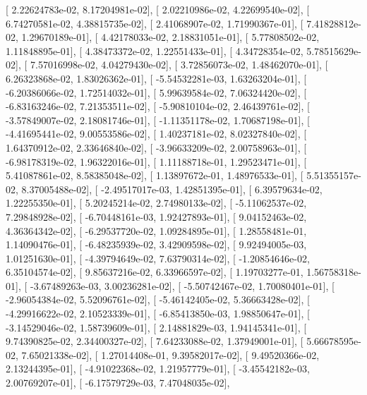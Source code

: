 \documentclass{article}
\begin{document}
       [  2.22624783e-02,   8.17204981e-02],
       [  2.02210986e-02,   4.22699540e-02],
       [  6.74270581e-02,   4.38815735e-02],
       [  2.41068907e-02,   1.71990367e-01],
       [  7.41828812e-02,   1.29670189e-01],
       [  4.42178033e-02,   2.18831051e-01],
       [  5.77808502e-02,   1.11848895e-01],
       [  4.38473372e-02,   1.22551433e-01],
       [  4.34728354e-02,   5.78515629e-02],
       [  7.57016998e-02,   4.04279430e-02],
       [  3.72856073e-02,   1.48462070e-01],
       [  6.26323868e-02,   1.83026362e-01],
       [ -5.54532281e-03,   1.63263204e-01],
       [ -6.20386066e-02,   1.72514032e-01],
       [  5.99639584e-02,   7.06324420e-02],
       [ -6.83163246e-02,   7.21353511e-02],
       [ -5.90810104e-02,   2.46439761e-02],
       [ -3.57849007e-02,   2.18081746e-01],
       [ -1.11351178e-02,   1.70687198e-01],
       [ -4.41695441e-02,   9.00553586e-02],
       [  1.40237181e-02,   8.02327840e-02],
       [  1.64370912e-02,   2.33646840e-02],
       [ -3.96633209e-02,   2.00758963e-01],
       [ -6.98178319e-02,   1.96322016e-01],
       [  1.11188718e-01,   1.29523471e-01],
       [  5.41087861e-02,   8.58385048e-02],
       [  1.13897672e-01,   1.48976533e-01],
       [  5.51355157e-02,   8.37005488e-02],
       [ -2.49517017e-03,   1.42851395e-01],
       [  6.39579634e-02,   1.22255350e-01],
       [  5.20245214e-02,   2.74980133e-02],
       [ -5.11062537e-02,   7.29848928e-02],
       [ -6.70448161e-03,   1.92427893e-01],
       [  9.04152463e-02,   4.36364342e-02],
       [ -6.29537720e-02,   1.09284895e-01],
       [  1.28558481e-01,   1.14090476e-01],
       [ -6.48235939e-02,   3.42909598e-02],
       [  9.92494005e-03,   1.01251630e-01],
       [ -4.39794649e-02,   7.63790314e-02],
       [ -1.20854646e-02,   6.35104574e-02],
       [  9.85637216e-02,   6.33966597e-02],
       [  1.19703277e-01,   1.56758318e-01],
       [ -3.67489263e-03,   3.00236281e-02],
       [ -5.50742467e-02,   1.70080401e-01],
       [ -2.96054384e-02,   5.52096761e-02],
       [ -5.46142405e-02,   5.36663428e-02],
       [ -4.29916622e-02,   2.10523339e-01],
       [ -6.85413850e-03,   1.98850647e-01],
       [ -3.14529046e-02,   1.58739609e-01],
       [  2.14881829e-03,   1.94145341e-01],
       [  9.74390825e-02,   2.34400327e-02],
       [  7.64233088e-02,   1.37949001e-01],
       [  5.66678595e-02,   7.65021338e-02],
       [  1.27014408e-01,   9.39582017e-02],
       [  9.49520366e-02,   2.13244395e-01],
       [ -4.91022368e-02,   1.21957779e-01],
       [ -3.45542182e-03,   2.00769207e-01],
       [ -6.17579729e-03,   7.47048035e-02],
\end{document}
